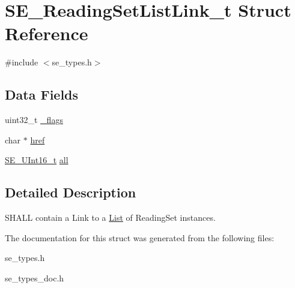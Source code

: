 \hypertarget{structSE__ReadingSetListLink__t}{}\section{S\+E\+\_\+\+Reading\+Set\+List\+Link\+\_\+t Struct Reference}
\label{structSE__ReadingSetListLink__t}


{\ttfamily \#include $<$se\+\_\+types.\+h$>$}

\subsection*{Data Fields}
\begin{DoxyCompactItemize}
\item 
uint32\+\_\+t \hyperlink{group__ReadingSetListLink_ga3d172a0c6b5174867353b4f36a430f0f}{\+\_\+flags}
\item 
char $\ast$ \hyperlink{group__ReadingSetListLink_ga0ae032cf6c2098b273bc37628b88ac92}{href}
\item 
\hyperlink{group__UInt16_gac68d541f189538bfd30cfaa712d20d29}{S\+E\+\_\+\+U\+Int16\+\_\+t} \hyperlink{group__ReadingSetListLink_ga291434e7c08011bebfd4f6525890f6d6}{all}
\end{DoxyCompactItemize}


\subsection{Detailed Description}
S\+H\+A\+LL contain a Link to a \hyperlink{structList}{List} of Reading\+Set instances. 

The documentation for this struct was generated from the following files\+:\begin{DoxyCompactItemize}
\item 
se\+\_\+types.\+h\item 
se\+\_\+types\+\_\+doc.\+h\end{DoxyCompactItemize}
